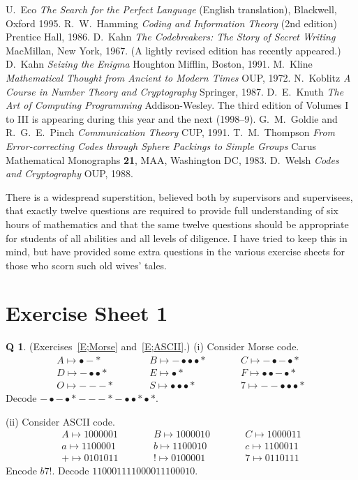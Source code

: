 \documentclass[12pt,a4paper]{article}
\theoremstyle{plain}
\theoremstyle{definition}
\newtheorem{question}[theorem]{Q}
\begin{document}
\begin{thebibliography}{99}
 U.~Eco \emph{The Search for the Perfect Language}
(English translation), Blackwell, Oxford 1995.
 R.~W.~Hamming \emph{Coding and Information Theory}
(2nd edition) Prentice Hall, 1986.
 D.~Kahn \emph{The Codebreakers:
The Story of Secret Writing} MacMillan, New York, 1967.
(A lightly revised edition has recently appeared.)
 D.~Kahn
\emph{Seizing the Enigma} Houghton Mifflin, Boston, 1991.
 M.~Kline
\emph{Mathematical Thought from Ancient to
Modern Times} OUP, 1972.
 N.~Koblitz
\emph{A Course in Number Theory and Cryptography}
Springer, 1987.
 D.~E.~Knuth
\emph{The Art of Computing Programming}
Addison-Wesley. The third edition of
Volumes I to III is appearing during
this year and the next (1998--9).
 G.~M.~Goldie and R.~G.~E.~Pinch
\emph{Communication Theory}
CUP, 1991.
 T.~M.~Thompson
\emph{From Error-correcting Codes through Sphere Packings
to Simple Groups} Carus Mathematical Monographs {\bf 21},
MAA, Washington DC, 1983.
 D.~Welsh \emph{Codes and Cryptography}
OUP, 1988.
\end{thebibliography}


\newpage
There is a widespread superstition, believed both by supervisors
and supervisees, that exactly twelve questions are required
to provide full understanding of six hours of  mathematics
and that the same twelve questions should be appropriate
for students of all abilities and all levels of diligence. I have tried
to keep this in mind, but have provided some extra questions
in the various exercise sheets
for those who scorn such old wives' tales.
 
\section{Exercise Sheet 1}
\begin{question}\label{C1.1} 
(Exercises~\ref{E;Morse} and~\ref{E;ASCII}.) (i) 
Consider Morse code.
\begin{align*}
A\mapsto \bullet-*\qquad
&&B\mapsto -\bullet\bullet\bullet*\qquad
&&C\mapsto-\bullet-\bullet*\\
D\mapsto -\bullet\bullet*\qquad
&&E\mapsto \bullet*\qquad
&&F\mapsto\bullet\bullet-\bullet*\\
O\mapsto ---*\qquad
&&S\mapsto\bullet\bullet\bullet*\qquad
&&7\mapsto--\bullet\bullet\bullet*
\end{align*}
Decode
$-\bullet-\bullet*---*-\bullet\bullet* \bullet*$.


(ii) Consider ASCII code.
\begin{align*}
A\mapsto 1000001\qquad
&&B\mapsto 1000010\qquad
&&C\mapsto 1000011\\
a\mapsto 1100001\qquad
&&b\mapsto 1100010 \qquad
&&c\mapsto 1100011\\
+\mapsto 0101011\qquad
&&!\mapsto 0100001\qquad
&&7\mapsto 0110111
\end{align*}
Encode $b7!$. Decode $110001111000011100010$.
\end{question}
\end{document}
